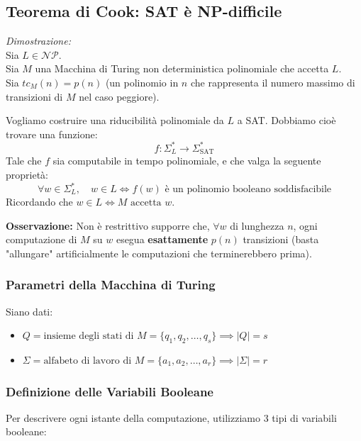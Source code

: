 \subsection{Teorema di Cook: SAT è NP-difficile}

\textit{Dimostrazione:} \\
Sia $L \in \mathcal{NP}$. \\
Sia $M$ una Macchina di Turing non deterministica polinomiale che accetta $L$. \\
Sia $tc_M(n) = p(n)$ (un polinomio in $n$ che rappresenta il numero massimo di transizioni di $M$ nel caso peggiore).

Vogliamo costruire una riducibilità polinomiale da $L$ a SAT. Dobbiamo cioè trovare una funzione:
$$ f: \Sigma_L^* \longrightarrow \Sigma_{\text{SAT}}^* $$
Tale che $f$ sia computabile in tempo polinomiale, e che valga la seguente proprietà:
$$ \forall w \in \Sigma_L^*, \quad w \in L \iff f(w) \text{ è un polinomio booleano soddisfacibile} $$
Ricordando che $w \in L \iff M \text{ accetta } w$.

\vspace{0.3cm}
\textbf{Osservazione:} Non è restrittivo supporre che, $\forall w$ di lunghezza $n$, ogni computazione di $M$ su $w$ esegua \textbf{esattamente} $p(n)$ transizioni (basta "allungare" artificialmente le computazioni che terminerebbero prima).

\vspace{0.4cm}
\subsubsection*{Parametri della Macchina di Turing}
Siano dati:
\begin{itemize}
    \item $Q = \text{insieme degli stati di } M = \{q_1, q_2, \dots, q_s\} \implies |Q| = s$
    \item $\Sigma = \text{alfabeto di lavoro di } M = \{a_1, a_2, \dots, a_r\} \implies |\Sigma| = r$
\end{itemize}

\vspace{0.6cm}
\subsubsection*{Definizione delle Variabili Booleane}
Per descrivere ogni istante della computazione, utilizziamo 3 tipi di variabili booleane:

